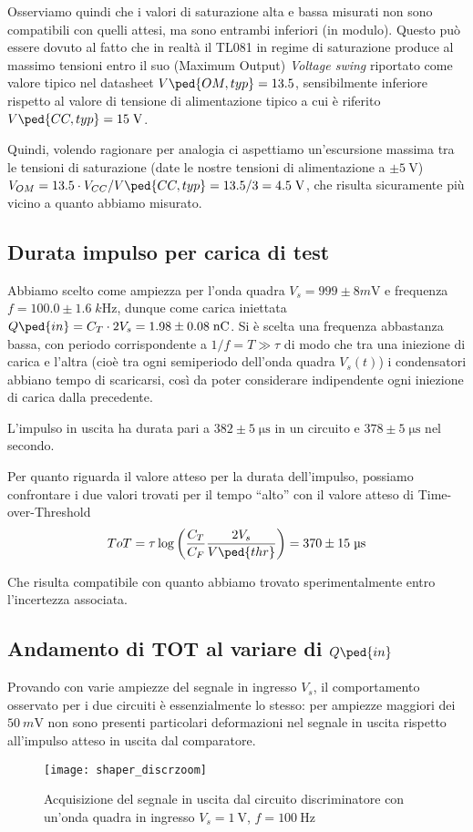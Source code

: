 \documentclass[10pt, a4paper, italian]{article}
\begin{document}
Osserviamo quindi che i valori di saturazione alta e bassa misurati non sono
compatibili con quelli attesi, ma sono entrambi inferiori (in modulo). Questo
può essere dovuto al fatto che in realtà il TL081 in regime di saturazione
produce al massimo tensioni entro il suo (Maximum Output) \emph{Voltage swing}
riportato come valore tipico nel datasheet $V\ped{OM, typ} = 13.5$,
sensibilmente inferiore rispetto al valore di tensione di alimentazione tipico
a cui è riferito $V\ped{CC, typ} = 15 \; \si{\V}$.

Quindi, volendo ragionare per analogia ci aspettiamo un'escursione massima tra
le tensioni di saturazione (date le nostre tensioni di alimentazione a
$\pm \SI{5}{\V}$) $V_{OM} = 13.5 \cdot V_{CC} / V\ped{CC, typ} =
13.5 /3 = 4.5 \; \si{\V}$, che risulta sicuramente più vicino a quanto
abbiamo misurato.

\subsection{Durata impulso per carica di test}
Abbiamo scelto come ampiezza per l'onda quadra $V_s = 999 \pm 8 \si{m\V}$ e
frequenza $f = 100.0 \pm 1.6 \; \si{k\Hz}$, dunque come carica
iniettata $Q\ped{in} = C_T \cdot 2 V_s = 1.98 \pm 0.08 \; \si{n\coulomb}$.
Si è scelta una frequenza abbastanza bassa, con periodo corrispondente a
$1/f = T \gg \tau$ di modo che tra una iniezione di carica e l'altra (cioè tra
ogni semiperiodo dell'onda quadra $V_s (t)$) i condensatori abbiano tempo di
scaricarsi, così da poter considerare indipendente ogni iniezione di carica
dalla precedente.

L'impulso in uscita ha durata pari a $382 \pm 5 \; \si{\micro\s}$ in un
circuito e $378 \pm 5 \; \si{\micro\s}$ nel secondo.

Per quanto riguarda il valore atteso per la durata dell'impulso, possiamo
confrontare i due valori trovati per il tempo ``alto'' con il valore atteso
di Time-over-Threshold
\[
ToT = \tau \log\left(\frac{C_T}{C_F} \frac{2 V_s}{V\ped{thr}}\right) =
370 \pm 15 \; \si{\micro\s}
\]

Che risulta compatibile con quanto abbiamo trovato sperimentalmente entro
l'incertezza associata.

\subsection{Andamento di TOT al variare di $Q\ped{in}$}
Provando con varie ampiezze del segnale in ingresso $V_s$, il comportamento
osservato per i due circuiti è essenzialmente lo stesso: per ampiezze maggiori
dei $\SI{50}{m\V}$ non sono presenti particolari deformazioni nel segnale
in uscita rispetto all'impulso atteso in uscita dal comparatore.
\begin{figure}[htbp]
	\centering
	\texttt{[image: shaper\_discrzoom]}
	\caption{Acquisizione del segnale in uscita dal circuito discriminatore con
	un'onda quadra in ingresso $V_s = \SI{1}{\V}$, $f = \SI{100}{\Hz}$
	\label{fig: shaperdiscr}}
\end{figure}
\end{document}
